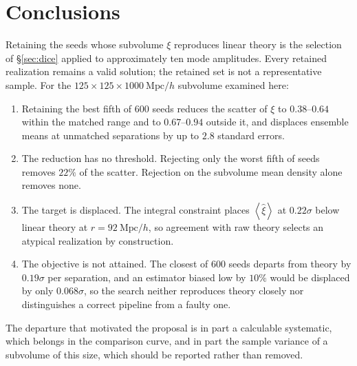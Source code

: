 \documentclass[12pt]{article}
\newcommand{\avg}[1]{\left\langle #1 \right\rangle}
\newcommand{\Mpch}{\ \mathrm{Mpc}/h}
\begin{document}
\section{Conclusions}\label{sec:conclusions}

Retaining the seeds whose subvolume $\xi$ reproduces linear theory is the
selection of \S\ref{sec:dice} applied to approximately ten mode amplitudes.
Every retained realization remains a valid solution; the retained set is not a
representative sample.  For the $125 \times 125 \times 1000\Mpch$ subvolume
examined here:

\begin{enumerate}
  \item Retaining the best fifth of 600 seeds reduces the scatter of $\xi$ to
        $0.38$--$0.64$ within the matched range and to $0.67$--$0.94$ outside
        it, and displaces ensemble means at unmatched separations by up to
        $2.8$ standard errors.
  \item The reduction has no threshold.  Rejecting only the worst fifth of
        seeds removes $22\%$ of the scatter.  Rejection on the subvolume mean
        density alone removes none.
  \item The target is displaced.  The integral constraint places
        $\avg{\hat\xi}$ at $0.22\sigma$ below linear theory at $r = 92\Mpch$,
        so agreement with raw theory selects an atypical realization by
        construction.
  \item The objective is not attained.  The closest of 600 seeds departs from
        theory by $0.19\sigma$ per separation, and an estimator biased low by
        $10\%$ would be displaced by only $0.068\sigma$, so the search neither
        reproduces theory closely nor distinguishes a correct pipeline from a
        faulty one.
\end{enumerate}

The departure that motivated the proposal is in part a calculable systematic,
which belongs in the comparison curve, and in part the sample variance of a
subvolume of this size, which should be reported rather than removed.


\end{document}
